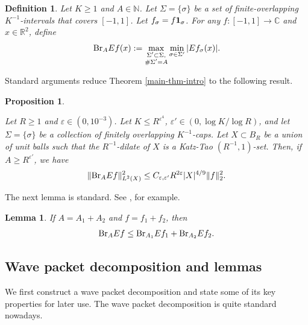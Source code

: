 \documentclass{amsart}
\numberwithin{equation}{section}
\newtheorem{lemma}[theorem]{Lemma}
\newtheorem{proposition}[theorem]{Proposition}
\newtheorem{definition}[theorem]{Definition}
\newcommand{\e}{\varepsilon}
\newcommand{\si}{\sigma}
\newcommand{\Si}{\Sigma}
\newcommand{\ZR}{\mathbb{R}}
\newcommand{\ZC}{\mathbb{C}}
\newcommand{\ZN}{\mathbb{N}}
\newcommand{\Id}{{\bf 1}}
\newcommand{\BR}{{\rm{Br}}}
\begin{document}
\begin{definition}
\label{def-broad-function}
Let $K\geq 1$ and $A\in\ZN$.
Let $\Si=\{\si\}$ be a set of finite-overlapping $K^{-1}$-intervals that covers $[-1,1]$. 
Let $f_\si=f\Id_\si$.
For any $f:[-1,1]\to\ZC$ and  $x\in \ZR^2$, define 
\begin{equation}
    \BR_A Ef(x):=\max_{\substack{\Si'\subset\Si,\\ \#\Si'=A}}\min_{\si\in\Si'}|Ef_\si(x)|.
\end{equation}
\end{definition}


Standard arguments reduce Theorem \ref{main-thm-intro} to the following result.


\begin{proposition}

\label{main-prop}

Let $R\geq 1$ and $\e\in(0,10^{-3})$.
Let $K\leq R^{\e^4}$, $\e'\in(0,\log K/\log R)$, and let $\Si=\{\si\}$ be a collection of finitely overlapping $K^{-1}$-caps. 
Let $X\subset B_R$ be a union of unit balls such that the $R^{-1}$-dilate of $X$ is a Katz-Tao $(R^{-1},1)$-set.
Then, if $A\geq R^{\e'}$, we have 
\begin{equation}
\label{main-esti}
    \|\BR_A Ef\|_{L^2(X)}^2\leq C_{\e,\e'} R^{2\e}|X|^{4/9}\|f\|_2^2.
\end{equation}

\end{proposition}
\smallskip

The next lemma is standard.
See \cite{Guth-R3}, for example.
\begin{lemma}
If $A=A_1+A_2$ and $f=f_1+f_2$, then
\begin{equation}
\label{broad-triangle}
    \BR_A Ef\leq \BR_{A_1} Ef_1+\BR_{A_2}Ef_2.
\end{equation}
\end{lemma}

\medskip





\subsection{Wave packet decomposition and lemmas}

We first construct a wave packet decomposition and state some of its key properties for later use.
The wave packet decomposition is quite standard nowadays.


\smallskip
\end{document}

